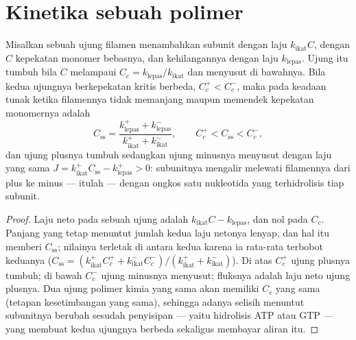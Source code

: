 \section{Kinetika sebuah polimer}

\begin{theorem}\label{thm:b3:cytoskeleton-motility:treadmilling}
Misalkan sebuah ujung filamen menambahkan subunit dengan laju $k_{\text{ikat}}C$,
dengan $C$ kepekatan monomer bebasnya, dan kehilangannya dengan laju
$k_{\text{lepas}}$. Ujung itu tumbuh bila $C$ melampaui \emph{} $C_{c} = k_{\text{lepas}}/k_{\text{ikat}}$ dan menyusut di bawahnya.
Bila kedua ujungnya berkepekatan kritis berbeda, $C_{c}^{+}
< C_{c}^{-}$, maka pada keadaan tunak ketika filamennya tidak memanjang
maupun memendek kepekatan monomernya adalah
\[
C_{\text{ss}} = \frac{k_{\text{lepas}}^{+} + k_{\text{lepas}}^{-}}
{k_{\text{ikat}}^{+} + k_{\text{ikat}}^{-}},
\qquad C_{c}^{+} < C_{\text{ss}} < C_{c}^{-},
\]
dan ujung plusnya tumbuh sedangkan ujung minusnya menyusut dengan laju yang
sama $J = k_{\text{ikat}}^{+}C_{\text{ss}} - k_{\text{lepas}}^{+} > 0$: subunitnya
mengalir melewati filamennya dari plus ke minus --- itulah \emph{} --- dengan ongkos satu nukleotida yang terhidrolisis tiap subunit.
\end{theorem}
\begin{proof}
Laju neto pada sebuah ujung adalah $k_{\text{ikat}}C - k_{\text{lepas}}$, dan nol
pada $C_{c}$. Panjang yang tetap menuntut jumlah kedua laju netonya
lenyap, dan hal itu memberi $C_{\text{ss}}$; nilainya terletak di antara kedua
 karena ia rata-rata terbobot keduanya ($C_{\text{ss}} =
(k_{\text{ikat}}^{+}C_{c}^{+} + k_{\text{ikat}}^{-}C_{c}^{-})/(k_{\text{ikat}}^{+}
+ k_{\text{ikat}}^{-})$). Di atas $C_{c}^{+}$ ujung plusnya tumbuh; di bawah
$C_{c}^{-}$ ujung minusnya menyusut; fluksnya adalah laju neto ujung plusnya.
Dua ujung polimer kimia yang sama akan memiliki $C_{c}$ yang sama (tetapan
kesetimbangan yang sama), sehingga adanya selisih menuntut subunitnya berubah
sesudah penyisipan --- yaitu hidrolisis ATP atau GTP --- yang membuat kedua
ujungnya berbeda sekaligus membayar aliran itu.
\end{proof}

